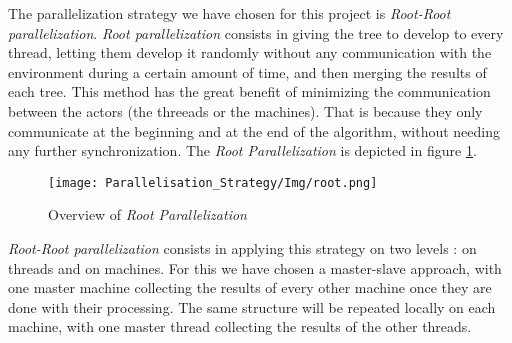 The parallelization strategy we have chosen for this project is \emph{Root-Root parallelization}.
\emph{Root parallelization} consists in giving the tree to develop to every thread, letting them develop it randomly without any communication with the environment during a certain amount of time, and then merging the results of each tree.
This method has the great benefit of minimizing the communication between the actors (the threeads or the machines).
That is because they only communicate at the beginning and at the end of the algorithm, without needing any further synchronization.
The \textit{Root Parallelization} is depicted in figure \ref{fig:root}.

\begin{figure}[!ht] 
\centerline{\texttt{[image: Parallelisation\_Strategy/Img/root.png]}}
   \caption{Overview of \emph{Root Parallelization} \cite{parallel_comp}}
\label{fig:root}
\end{figure}

\emph{Root-Root parallelization} consists in applying this strategy on two levels : on threads and on machines.
For this we have chosen a master-slave approach, with one master machine collecting the results of every other machine once they are done with their processing.
The same structure will be repeated locally on each machine, with one master thread collecting the results of the other threads.